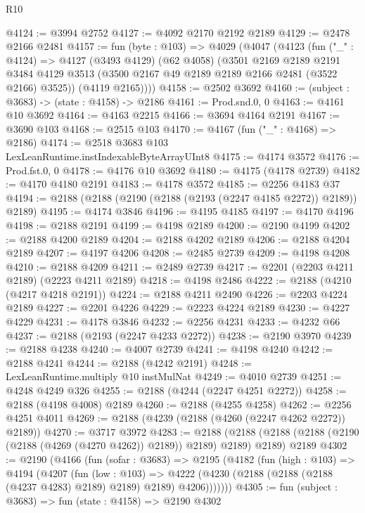 \begin{lexlean}{R10}
\begin{coremodule}
@4124 := @3994 @2752
@4127 := @4092 @2170 @2192 @2189
@4129 := @2478 @2166 @2481
@4157 := fun (byte : @103) =>
  @4029
    (@4047
      (@4123
        (fun ("_" : @4124) =>
        @4127
          (@3493 @4129)
          (@62 @4058)
          (@3501
            @2169
            @2189
            @2191
            @3484
            @4129
            @3513
            (@3500 @2167 @49 @2189 @2189 @2166 @2481 (@3522 @2166) @3525))
          (@4119 @2165))))
@4158 := @2502 @3692
@4160 := (subject : @3683) -> (state : @4158) -> @2186
@4161 := Prod.snd.{0, 0}
@4163 := @4161 @10 @3692
@4164 := @4163 @2215
@4166 := @3694 @4164 @2191
@4167 := @3690 @103
@4168 := @2515 @103
@4170 := @4167 (fun ("_" : @4168) => @2186)
@4174 := @2518 @3683 @103 LexLeanRuntime.instIndexableByteArrayUInt8
@4175 := @4174 @3572
@4176 := Prod.fst.{0, 0}
@4178 := @4176 @10 @3692
@4180 := @4175 (@4178 @2739)
@4182 := @4170 @4180 @2191
@4183 := @4178 @3572
@4185 := @2256 @4183 @37
@4194 := @2188 (@2188 (@2190 (@2188 (@2193 (@2247 @4185 @2272)) @2189)) @2189)
@4195 := @4174 @3846
@4196 := @4195 @4185
@4197 := @4170 @4196
@4198 := @2188 @2191
@4199 := @4198 @2189
@4200 := @2190 @4199
@4202 := @2188 @4200 @2189
@4204 := @2188 @4202 @2189
@4206 := @2188 @4204 @2189
@4207 := @4197 @4206
@4208 := @2485 @2739
@4209 := @4198 @4208
@4210 := @2188 @4209
@4211 := @2489 @2739
@4217 := @2201 (@2203 @4211 @2189) (@2223 @4211 @2189)
@4218 := @4198 @2486
@4222 := @2188 (@4210 (@4217 @4218 @2191))
@4224 := @2188 @4211 @2490
@4226 := @2203 @4224 @2189
@4227 := @2201 @4226
@4229 := @2223 @4224 @2189
@4230 := @4227 @4229
@4231 := @4178 @3846
@4232 := @2256 @4231
@4233 := @4232 @66
@4237 := @2188 (@2193 (@2247 @4233 @2272))
@4238 := @2190 @3970
@4239 := @2188 @4238
@4240 := @4007 @2739
@4241 := @4198 @4240
@4242 := @2188 @4241
@4244 := @2188 (@4242 @2191)
@4248 := LexLeanRuntime.multiply @10 instMulNat
@4249 := @4010 @2739
@4251 := @4248 @4249 @326
@4255 := @2188 (@4244 (@2247 @4251 @2272))
@4258 := @2188 (@4198 @4008) @2189
@4260 := @2188 (@4255 @4258)
@4262 := @2256 @4251 @4011
@4269 := @2188 (@4239 (@2188 (@4260 (@2247 @4262 @2272)) @2189))
@4270 := @3717 @3972
@4283 := @2188
    (@2188 (@2188 (@2188 (@2190 (@2188 (@4269 (@4270 @4262)) @2189)) @2189) @2189) @2189)
    @2189
@4302 := @2190
    (@4166
      (fun (sofar : @3683) =>
      @2195
        (@4182
          (fun (high : @103) =>
          @4194
            (@4207
              (fun (low : @103) =>
              @4222 (@4230 (@2188 (@2188 (@2188 (@4237 @4283) @2189) @2189) @2189) @4206)))))))
@4305 := fun (subject : @3683) => fun (state : @4158) => @2190 @4302

\end{coremodule}
\end{lexlean}
